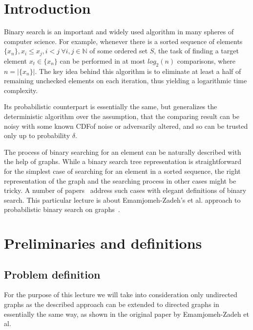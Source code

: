 

\maketitle

\section{Introduction}
Binary search is an important and widely used algorithm in many spheres of computer science. For example, whenever there is a sorted sequence of elements $\{x_n\}, x_i \le x_j, i < j~\forall i,j \in \mathds{N}$ of some ordered set $S$, the task of finding a target element $x_t \in \{x_n\}$ can be performed in at most $log_2(n)$ comparisons, where $n = |\{x_n\}|$. The key idea behind this algorithm is to eliminate at least a half of remaining unchecked elements on each iteration, thus yielding a logarithmic time complexity.


Its probabilistic counterpart is essentially the same, but generalizes the deterministic algorithm over the assumption, that the comparing result can be noisy with some known CDF\footnotemark[1] of noise or adversarily altered, and so can be trusted only up to probability $\delta$.


The process of binary searching for an element can be naturally described with the help of graphs. While a binary search tree representation is straightforward for the simplest case of searching for an element in a sorted sequence, the right representation of the graph and the searching process in other cases might be tricky. A number of papers~\cite{main, karp, benor} address such cases with elegant definitions of binary search. This particular lecture is about Emamjomeh-Zadeh's et al. approach to probabilistic binary search on graphs~\cite{main}.


\section{Preliminaries and definitions}
\subsection*{Problem definition}
For the purpose of this lecture we will take into consideration only undirected graphs as the described approach can be extended to directed graphs in essentially the same way, as shown in the original paper by Emamjomeh-Zadeh et al.



